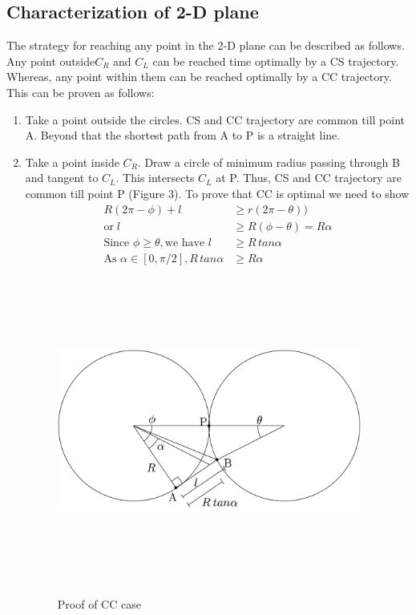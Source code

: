 \documentclass[11pt]{article} %
\begin{document}
\subsection{Characterization of 2-D plane}
The strategy for reaching any point in the 2-D plane can be described as follows. 
Any point outside$C_R$ and $C_L$ can be reached time optimally by a CS trajectory. Whereas, any point within them can be reached optimally by a CC trajectory.
This can be proven as follows:
\begin{enumerate}[I]
\item Take a point outside the circles. CS and CC trajectory are common till point A. Beyond that the shortest path from A to P is a straight line.
\item Take a point inside $C_R$. Draw a circle of minimum radius passing through B and tangent to $C_L$. This intersects $C_L$ at P. Thus, CS and CC trajectory are common till point P (Figure 3). To prove that CC is optimal we need to show 
\begin{equation}
\begin{aligned}
R(2\pi - \phi) + l &\geq r(2\pi - \theta))\\
\textrm{or}\; l &\geq R(\phi - \theta) = R\alpha\\
\textrm{Since }\phi \geq \theta, \textrm{we have } l &\geq R\,tan\alpha\\
\textrm{As }\alpha \in [0, \pi/2], R\,tan\alpha &\geq  R\alpha
\end{aligned}
\end{equation}
\begin{figure}[H]
\includegraphics[width=10cm,height=10cm,keepaspectratio]{CC_proof.png}
\label{fig:cc_proof}
\caption{Proof of CC case}
\end{figure}

\end{enumerate} 
\end{document}
